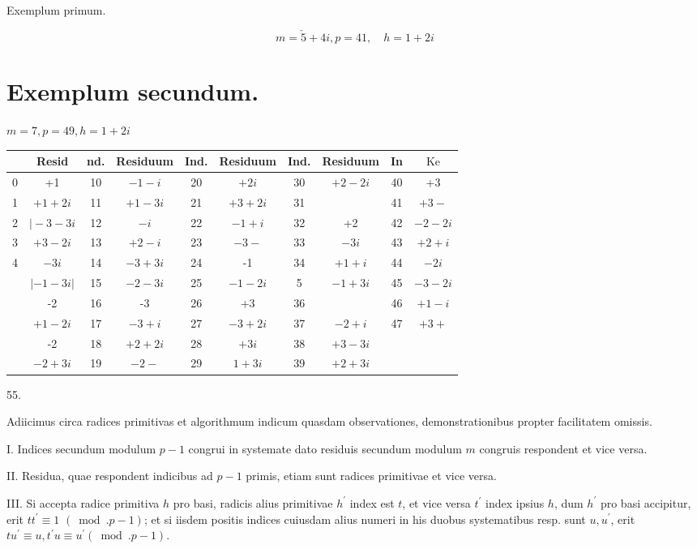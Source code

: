 \documentclass[10pt]{article}
\begin{document}
Exemplum primum.

\[
m=\check{5}+4 i, p=41, \quad h=1+2 i
\]

\section*{Exemplum secundum.}
\(m=7, p=49, h=1+2 i\)

\begin{center}
\begin{tabular}{|c|c|c|c|c|c|c|c|c|c|}
\hline
 & Resid & nd. & Residuum & Ind. & Residuum & Ind. & Residuum & In & \(\mathrm{Ke}\) \\
\hline
0 & +1 & 10 & \(-1-i\) & 20 & \(+2 i\) & 30 & \(+2-2 i\) & 40 & +3 \\
\hline
1 & \(+1+2 i\) & 11 & \(+1-3 i\) & 21 & \(+3+2 i\) & 31 &  & 41 & \(+3-\) \\
\hline
2 & \(\mid-3-3 i\) & 12 & \(-i\) & 22 & \(-1+i\) & 32 & +2 & 42 & \(-2-2 i\) \\
\hline
3 & \(+3-2 i\) & 13 & \(+2-i\) & 23 & \(-3-\) & 33 & \(-3 i\) & 43 & \(+2+i\) \\
\hline
4 & \(-3 i\) & 14 & \(-3+3 i\) & 24 & -1 & 34 & \(+1+i\) & 44 & \(-2 i\) \\
\hline
 & \(|-1-3 i|\) & 15 & \(-2-3 i\) & 25 & \(-1-2 i\) & 5 & \(-1+3 i\) & 45 & \(-3-2 i\) \\
\hline
 & -2 & 16 & -3 & 26 & +3 & 36 &  & 46 & \(+1-i\) \\
\hline
 & \(+1-2 i\) & 17 & \(-3+i\) & 27 & \(-3+2 i\) & 37 & \(-2+i\) & 47 & \(+3+\) \\
\hline
 & -2 & 18 & \(+2+2 i\) & 28 & \(+3 i\) & 38 & \(+3-3 i\) &  &  \\
\hline
 & \(-2+3 i\) & 19 & \(-2-\) & 29 & \(1+3 i\) & 39 & \(+2+3 i\) &  &  \\
\hline
\end{tabular}
\end{center}

55.

Adiicimus circa radices primitivas et algorithmum indicum quasdam observationes, demonstrationibus propter facilitatem omissis.

I. Indices secundum modulum \(p-1\) congrui in systemate dato residuis secundum modulum \(m\) congruis respondent et vice versa.

II. Residua, quae respondent indicibus ad \(p-1\) primis, etiam sunt radices primitivae et vice versa.

III. Si accepta radice primitiva \(h\) pro basi, radicis alius primitivae \(h^{\prime}\) index est \(t\), et vice versa \(t^{\prime}\) index ipsius \(h\), dum \(h^{\prime}\) pro basi accipitur, erit \(t t^{\prime} \equiv 1\) \((\bmod . p-1)\); et si iisdem positis indices cuiusdam alius numeri in his duobus systematibus resp. sunt \(u, u^{\prime}\), erit \(t u^{\prime} \equiv u, t^{\prime} u \equiv u^{\prime}(\bmod . p-1)\).
\end{document}
